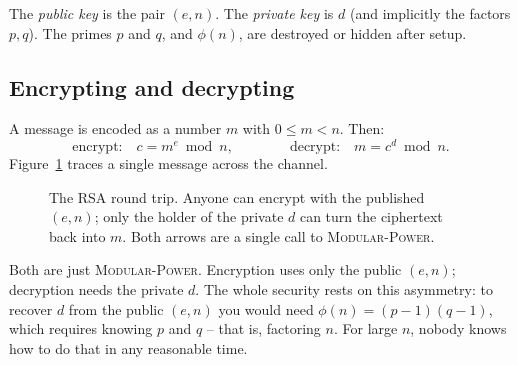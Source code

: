The \emph{public key} is the pair $(e, n)$. The \emph{private key} is $d$ (and
implicitly the factors $p, q$). The primes $p$ and $q$, and $\phi(n)$, are
destroyed or hidden after setup.

\subsection{Encrypting and decrypting}

A message is encoded as a number $m$ with $0 \le m < n$. Then:
\[
  \text{encrypt:}\quad c = m^{e} \bmod n,
  \qquad\qquad
  \text{decrypt:}\quad m = c^{d} \bmod n.
\]
Figure~\ref{ch30:fig-rsa} traces a single message across the channel.

\begin{figure}[H]
\centering
{}
\caption{The RSA round trip. Anyone can encrypt with the published $(e,n)$;
only the holder of the private $d$ can turn the ciphertext back into $m$. Both
arrows are a single call to \textsc{Modular-Power}.}
\label{ch30:fig-rsa}
\end{figure}

Both are just \textsc{Modular-Power}. Encryption uses only the public $(e,n)$;
decryption needs the private $d$. The whole security rests on this asymmetry:
to recover $d$ from the public $(e,n)$ you would need $\phi(n) = (p-1)(q-1)$,
which requires knowing $p$ and $q$ -- that is, factoring $n$. For large $n$,
nobody knows how to do that in any reasonable time.

